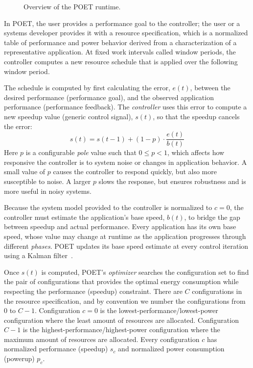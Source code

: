 \begin{figure}[t]
  \begin{centering}
    
    \caption{Overview of the POET runtime.}
    \label{fig:poet-runtime}
  \end{centering}
\end{figure}

In POET, the user provides a performance goal to the controller; the user or a systems developer provides it with a resource specification, which is a normalized table of performance and power behavior derived from a characterization of a representative application.
At fixed work intervals called window periods, the controller computes a new resource schedule that is applied over the following window period.

The schedule is computed by first calculating the error, $e(t)$, between the desired performance (performance goal), and the observed application performance (performance feedback).
The \emph{controller} uses this error to compute a new speedup value (generic control signal), $s(t)$, so that the speedup cancels the error:
\begin{equation}
  s(t) = s(t-1) + (1-p) \cdot \frac{e(t)}{b(t)} 
  \label{eqn:poet-control}
\end{equation}
Here $p$ is a configurable \emph{pole} value such that $0 \le p < 1$, which affects how responsive the controller is to system noise or changes in application behavior.
A small value of $p$ causes the controller to respond quickly, but also more susceptible to noise.
A larger $p$ slows the response, but ensures robustness and is more useful in noisy systems.

Because the system model provided to the controller is normalized to $c=0$, the controller must estimate the application's base speed, $b(t)$, to bridge the gap between speedup and actual performance.
Every application has its own base speed, whose value may change at runtime as the application progresses through different \emph{phases}.
POET updates its base speed estimate at every control iteration using a Kalman filter~\cite{welch2006kalman}.

Once $s(t)$ is computed, POET's \emph{optimizer} searches the configuration set to find the pair of configurations that provides the optimal energy consumption while respecting the performance (speedup) constraint.
There are $C$ configurations in the resource specification, and by convention we number the configurations from $0$ to $C-1$.
Configuration $c = 0$ is the lowest-performance/lowest-power configuration where the least amount of resources are allocated.
Configuration $C-1$ is the highest-performance/highest-power configuration where the maximum amount of resources are allocated.
Every configuration $c$ has normalized performance (speedup) $s_c$ and normalized power consumption (powerup) $p_c$.

